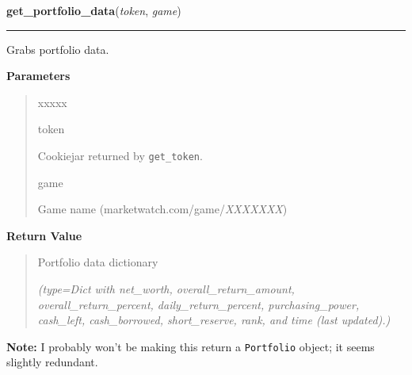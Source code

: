     \vspace{0.5ex}

\hspace{.8\funcindent}\begin{boxedminipage}{\funcwidth}

    \raggedright \textbf{get\_portfolio\_data}(\textit{token}, \textit{game})

    \vspace{-1.5ex}

    \rule{\textwidth}{0.5\fboxrule}
\setlength{\parskip}{2ex}
    Grabs portfolio data.

\setlength{\parskip}{1ex}
      \textbf{Parameters}
      \vspace{-1ex}

      \begin{quote}
        \begin{Ventry}{xxxxx}

          \item[token]

          Cookiejar returned by \texttt{get\_token}.

          \item[game]

          Game name (marketwatch.com/game/\textit{XXXXXXX})

        \end{Ventry}

      \end{quote}

      \textbf{Return Value}
    \vspace{-1ex}

      \begin{quote}
      Portfolio data dictionary

      {\it (type=Dict with net\_worth, overall\_return\_amount, 
      overall\_return\_percent, daily\_return\_percent, purchasing\_power, 
      cash\_left, cash\_borrowed, short\_reserve, rank, and time (last 
      updated).)}

      \end{quote}

\textbf{Note:} I probably won't be making this return a \texttt{Portfolio} object; it 
seems slightly redundant.



    \end{boxedminipage}

    \label{moira:get_token}

